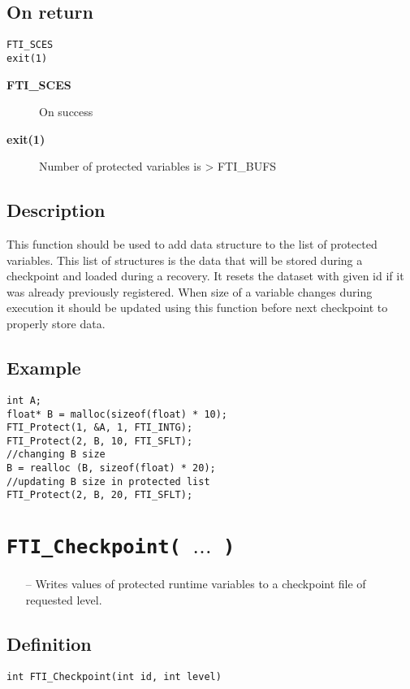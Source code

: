 \documentclass{refrep}
\begin{document}
\subsection*{On return}
\begin{lstlisting}[frame=single]
FTI_SCES
exit(1)
\end{lstlisting}
\begin{description}
\item[\textbf{FTI\_SCES}] On success
\item[\textbf{exit(1)}] Number of protected variables is > FTI\_BUFS
\end{description}
\subsection*{Description}
This function should be used to add data structure to the list of protected variables. This list of structures is the data that will be stored during a checkpoint and loaded during a recovery. It resets the dataset with given id if it was already previously registered. When size of a variable changes during execution it should be updated using this function before next checkpoint to properly store data.
\subsection*{Example}
\begin{center}
\begin{lstlisting}[frame=single]
int A;
float* B = malloc(sizeof(float) * 10);
FTI_Protect(1, &A, 1, FTI_INTG);
FTI_Protect(2, B, 10, FTI_SFLT);
//changing B size
B = realloc (B, sizeof(float) * 20);
//updating B size in protected list
FTI_Protect(2, B, 20, FTI_SFLT);
\end{lstlisting}
\end{center}
\newpage
\section{\tt FTI\_Checkpoint( $\dots$ )}\label{sec:fticheckpoint}
\begin{framed}
\begin{itemize}
\item[--] Writes values of protected runtime variables to a checkpoint file of requested level.
\end{itemize}
\end{framed}
\subsection*{Definition}
\begin{lstlisting}[frame=single]
int FTI_Checkpoint(int id, int level)
\end{lstlisting}
\end{document}
